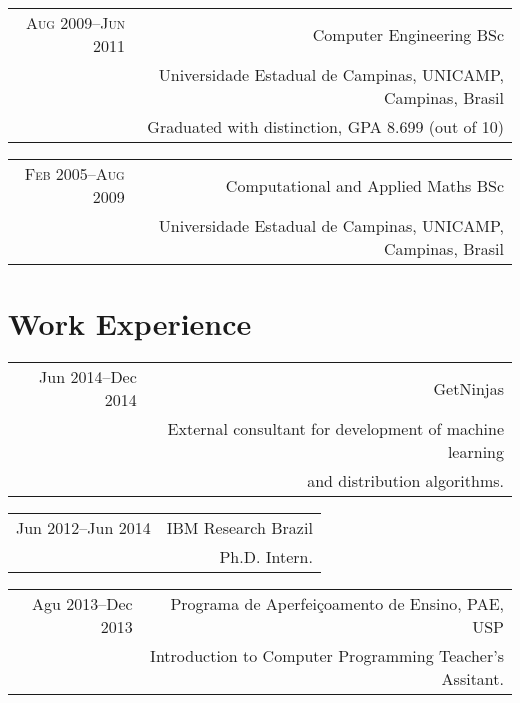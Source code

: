 \documentclass[a4paper,10pt]{article}
\begin{document}
\begin{tabularx}{\textwidth}{D|R}
\textsc{Aug 2009--Jun 2011} & Computer Engineering BSc\\
                            & Universidade Estadual de Campinas, UNICAMP, Campinas, Brasil\\
                            & \footnotesize Graduated with distinction, GPA 8.699 (out of 10)\\
\end{tabularx}

\begin{tabularx}{\textwidth}{D|R}
\textsc{Feb 2005--Aug 2009} & Computational and Applied Maths BSc\\
                            & Universidade Estadual de Campinas, UNICAMP, Campinas, Brasil\\
\end{tabularx}


\section{Work Experience}

\begin{tabularx}{\textwidth}{D|R}
Jun 2014--Dec 2014    & GetNinjas\\
                    & \footnotesize External consultant for development of machine learning\\
                    & \footnotesize and distribution algorithms.\\
\end{tabularx}

\begin{tabularx}{\textwidth}{D|R}
Jun 2012--Jun 2014   & IBM Research Brazil\\
                    & \footnotesize Ph.D. Intern.\\
\end{tabularx}

\begin{tabularx}{\textwidth}{D|R}
Agu 2013--Dec 2013   & Programa de Aperfeiçoamento de Ensino, PAE, USP\\
                    & \footnotesize Introduction to Computer Programming Teacher’s Assitant.\\
\end{tabularx}
\end{document}
